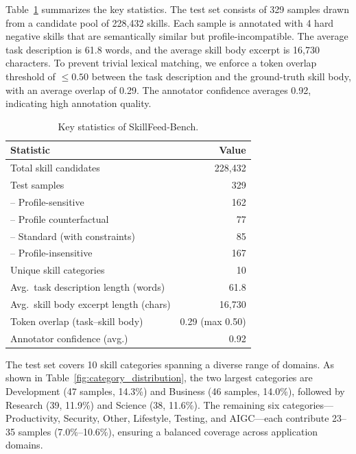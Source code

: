 \documentclass[letterpaper]{article} %
\begin{document}
Table~\ref{tab:dataset_stats} summarizes the key statistics. The test set consists of 329 samples drawn from a candidate pool of 228,432 skills. Each sample is annotated with 4 hard negative skills that are semantically similar but profile-incompatible. The average task description is 61.8 words, and the average skill body excerpt is 16,730 characters. To prevent trivial lexical matching, we enforce a token overlap threshold of $\leq 0.50$ between the task description and the ground-truth skill body, with an average overlap of 0.29. The annotator confidence averages 0.92, indicating high annotation quality.

\begin{table}[h]
\centering
\caption{Key statistics of SkillFeed-Bench.}
\label{tab:dataset_stats}
\begin{tabular}{l r}
\toprule
\textbf{Statistic} & \textbf{Value} \\
\midrule
Total skill candidates & 228,432 \\
Test samples & 329 \\
\quad -- Profile-sensitive & 162 \\
\quad \qquad -- Profile counterfactual & 77 \\
\quad \qquad -- Standard (with constraints) & 85 \\
\quad -- Profile-insensitive & 167 \\
Unique skill categories & 10 \\
Avg.\ task description length (words) & 61.8 \\
Avg.\ skill body excerpt length (chars) & 16,730 \\
Token overlap (task--skill body) & 0.29 (max 0.50) \\
Annotator confidence (avg.) & 0.92 \\
\bottomrule
\end{tabular}
\end{table}



The test set covers 10 skill categories spanning a diverse range of domains. As shown in Table~\ref{fig:category_distribution}, the two largest categories are Development (47 samples, 14.3\%) and Business (46 samples, 14.0\%), followed by Research (39, 11.9\%) and Science (38, 11.6\%). The remaining six categories---Productivity, Security, Other, Lifestyle, Testing, and AIGC---each contribute 23--35 samples (7.0\%--10.6\%), ensuring a balanced coverage across application domains.
\end{document}
